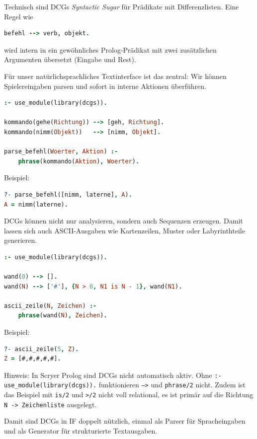 \documentclass[parskip=half,a4paper,11pt]{scrreprt}
\begin{document}
Technisch sind DCGs \textit{Syntactic Sugar} für Prädikate mit Differenzlisten. Eine Regel wie
\begin{lstlisting}[language=Prolog, caption={}]
befehl --> verb, objekt.
\end{lstlisting}
wird intern in ein gewöhnliches Prolog-Prädikat mit zwei zusätzlichen Argumenten übersetzt (Eingabe und Rest).

Für unser natürlichsprachliches Textinterface ist das zentral: Wir können Spielereingaben parsen und sofort in interne Aktionen überführen.

\begin{lstlisting}[language=Prolog,caption={}]
:- use_module(library(dcgs)).

kommando(gehe(Richtung)) --> [geh, Richtung].
kommando(nimm(Objekt))   --> [nimm, Objekt].

parse_befehl(Woerter, Aktion) :-
    phrase(kommando(Aktion), Woerter).
\end{lstlisting}

Beispiel:
\begin{lstlisting}[language=Prolog, caption={}]
?- parse_befehl([nimm, laterne], A).
A = nimm(laterne).
\end{lstlisting}

DCGs können nicht nur analysieren, sondern auch Sequenzen erzeugen. Damit lassen sich auch ASCII-Ausgaben wie Kartenzeilen, Muster oder Labyrinthteile generieren.

\begin{lstlisting}[language=Prolog,caption={}]
:- use_module(library(dcgs)).

wand(0) --> [].
wand(N) --> ['#'], {N > 0, N1 is N - 1}, wand(N1).

ascii_zeile(N, Zeichen) :-
    phrase(wand(N), Zeichen).
\end{lstlisting}

Beispiel:
\begin{lstlisting}[language=Prolog, caption={}]
?- ascii_zeile(5, Z).
Z = [#,#,#,#,#].
\end{lstlisting}

Hinweis: In Scryer Prolog sind DCGs nicht automatisch aktiv. Ohne \texttt{:- use\_module(library(dcgs)).} funktionieren \texttt{-->} und \texttt{phrase/2} nicht. Zudem ist das Beispiel mit \texttt{is/2} und \texttt{>/2} nicht voll relational, es ist primär auf die Richtung \texttt{N -> Zeichenliste} ausgelegt.

Damit sind DCGs in IF doppelt nützlich, einmal als Parser für Spracheingaben und als Generator für strukturierte Textausgaben.
\end{document}
